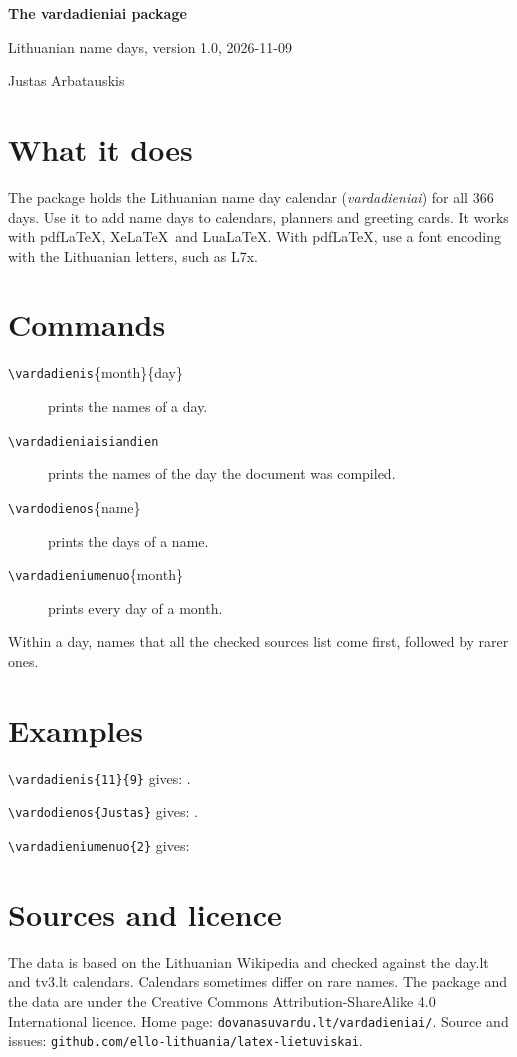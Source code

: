 \documentclass[11pt,a4paper]{article}
\newcommand\cs[1]{\texttt{\textbackslash #1}}
\begin{document}
\begin{center}
{\Large\bfseries The vardadieniai package}\par\vspace{2mm}
Lithuanian name days, version 1.0, 2026-11-09\par
Justas Arbatauskis
\end{center}

\section*{What it does}
The package holds the Lithuanian name day calendar (\emph{vardadieniai}) for all 366 days. Use it to add name days to calendars, planners and greeting cards. It works with pdf\LaTeX, Xe\LaTeX\ and Lua\LaTeX. With pdf\LaTeX, use a font encoding with the Lithuanian letters, such as L7x.

\section*{Commands}
\begin{description}
\item[\cs{vardadienis}\{month\}\{day\}] prints the names of a day.
\item[\cs{vardadieniaisiandien}] prints the names of the day the document was compiled.
\item[\cs{vardodienos}\{name\}] prints the days of a name.
\item[\cs{vardadieniumenuo}\{month\}] prints every day of a month.
\end{description}
Within a day, names that all the checked sources list come first, followed by rarer ones.

\section*{Examples}
\verb|\vardadienis{11}{9}| gives: .

\verb|\vardodienos{Justas}| gives: .

\verb|\vardadieniumenuo{2}| gives:


\section*{Sources and licence}
The data is based on the Lithuanian Wikipedia and checked against the day.lt and tv3.lt calendars. Calendars sometimes differ on rare names. The package and the data are under the Creative Commons Attribution-ShareAlike 4.0 International licence. Home page: \texttt{dovanasuvardu.lt/vardadieniai/}. Source and issues: \texttt{github.com/ello-lithuania/latex-lietuviskai}.
\end{document}
